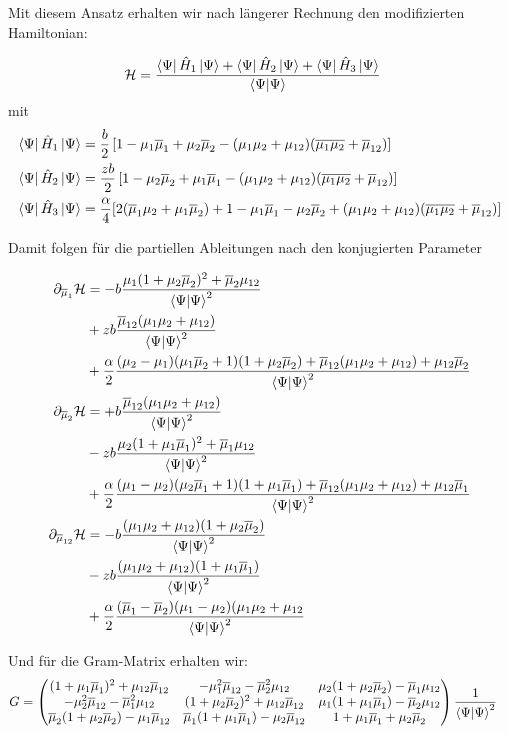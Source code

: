 Mit diesem Ansatz erhalten wir nach längerer Rechnung den modifizierten Hamiltonian:

\begin{align}
    \mathcal{H} &= \frac{\bra{\Psi}\hat{H}_1\ket{\Psi} +\bra{\Psi}\hat{H}_2\ket{\Psi} + \bra{\Psi}\hat{H}_3\ket{\Psi}}{\bra{\Psi}\ket{\Psi}}
\end{align}
mit 
\begin{align*}
    \bra{\Psi}\hat{H}_1\ket{\Psi} &=  \frac{b}{2}\left[ 1- \mu_1\overline{\mu}_1 + \mu_2\overline{\mu}_2 - (\mu_1 \mu_2 + \mu_{12})(\overline{\mu_1\mu_2} + \overline{\mu}_{12})\right] \\
    \bra{\Psi}\hat{H}_2\ket{\Psi} &=  \frac{z b}{2}\left[ 1- \mu_2\overline{\mu}_2 + \mu_1\overline{\mu}_1 - (\mu_1 \mu_2 + \mu_{12})(\overline{\mu_1\mu_2} + \overline{\mu}_{12})\right] \\
    \bra{\Psi}\hat{H}_3\ket{\Psi} &= \frac{\alpha}{4}[2(\overline{\mu}_1\mu_2 + \mu_1\overline{\mu}_2) + 1 - \mu_1\overline{\mu}_1 - \mu_2\overline{\mu}_2 + (\mu_1 \mu_2 + \mu_{12})(\overline{\mu_1\mu_2} + \overline{\mu}_{12})]
\end{align*}

\noindent Damit folgen für die partiellen Ableitungen nach den konjugierten Parameter

\begin{align*}
    \partial_{\overline{\mu}_1} \mathcal{H} &= 
    -b \frac{\mu_1(1+\mu_2\overline{\mu}_2)^2 + \overline{\mu}_2\mu_{12}}{\bra{\Psi}\ket{\Psi}^2}\\
    &+z b \frac{\overline{\mu}_{12}(\mu_1\mu_2 + \mu_{12})}{\bra{\Psi}\ket{\Psi}^2}\\
    &+\frac{\alpha}{2}\frac{(\mu_2-\mu_1)(\mu_1\overline{\mu}_2+1)(1+\mu_2\overline{\mu}_2)+\overline{\mu}_{12}(\mu_1\mu_2 + \mu_{12}) + \mu_{12}\overline{\mu}_2}{\bra{\Psi}\ket{\Psi}^2}\\
    \partial_{\overline{\mu}_2} \mathcal{H} &= 
    +b \frac{\overline{\mu}_{12}(\mu_1\mu_2 + \mu_{12})}{\bra{\Psi}\ket{\Psi}^2}\\
    &-z b \frac{\mu_2(1+\mu_1\overline{\mu}_1)^2 + \overline{\mu}_1\mu_{12}}{\bra{\Psi}\ket{\Psi}^2}\\
    &+\frac{\alpha}{2}\frac{(\mu_1-\mu_2)(\mu_2\overline{\mu}_1+1)(1+\mu_1\overline{\mu}_1)+\overline{\mu}_{12}(\mu_1\mu_2 + \mu_{12}) + \mu_{12}\overline{\mu}_1}{\bra{\Psi}\ket{\Psi}^2}\\
    \partial_{\overline{\mu}_{12}} \mathcal{H} &= 
    -b\frac{(\mu_1\mu_2+\mu_{12})(1+\mu_2\overline{\mu}_2)}{\bra{\Psi}\ket{\Psi}^2}\\
    &-zb\frac{(\mu_1\mu_2+\mu_{12})(1+\mu_1\overline{\mu}_1)}{\bra{\Psi}\ket{\Psi}^2}\\
    &+\frac{\alpha}{2}\frac{(\overline{\mu}_1-\overline{\mu}_2)(\mu_1-\mu_2)(\mu_1\mu_2+\mu_{12}}{\bra{\Psi}\ket{\Psi}^2}
\end{align*}

\noindent Und für die Gram-Matrix erhalten wir:
\begin{align}
    G &=
    \begin{pmatrix}
        (1+\mu_1\overline{\mu}_1)^2 + \mu_{12}\overline{\mu}_{12} & -\mu_1^2\overline{\mu}_{12} - \overline{\mu}_2^2\mu_{12} &  \mu_2(1+\mu_2\overline{\mu}_2)-\overline{\mu}_1\mu_{12}\\
        -\mu_2^2\overline{\mu}_{12} - \overline{\mu}_1^2\mu_{12} &(1+\mu_2\overline{\mu}_2)^2 + \mu_{12}\overline{\mu}_{12} & \mu_1(1+\mu_1\overline{\mu}_1)-\overline{\mu}_2\mu_{12}\\
        \overline{\mu}_2(1+\mu_2\overline{\mu}_2)-\mu_1\overline{\mu}_{12} & \overline{\mu}_1(1+\mu_1\overline{\mu}_1)-\mu_2\overline{\mu}_{12} & 1 + \mu_1\overline{\mu}_1 + \mu_2\overline{\mu}_2
    \end{pmatrix}\frac{1}{\bra{\Psi}\ket{\Psi}^2} 
\end{align}

